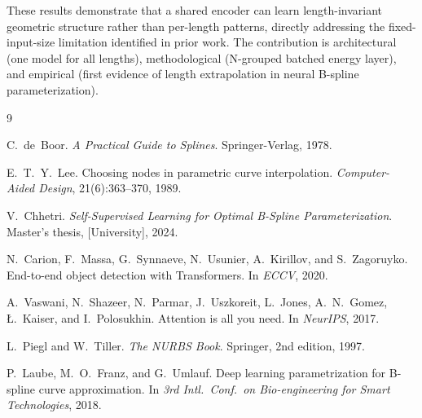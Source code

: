 \documentclass[11pt, a4paper]{article}
\begin{document}
These results demonstrate that a shared encoder can learn
length-invariant geometric structure rather than per-length patterns,
directly addressing the fixed-input-size limitation identified in
prior work. The contribution is architectural (one model for all
lengths), methodological (N-grouped batched energy layer), and
empirical (first evidence of length extrapolation in neural B-spline
parameterization).


\begin{thebibliography}{9}

C.~de~Boor.
\newblock \emph{A Practical Guide to Splines}.
\newblock Springer-Verlag, 1978.

E.~T.~Y.~Lee.
\newblock Choosing nodes in parametric curve interpolation.
\newblock \emph{Computer-Aided Design}, 21(6):363--370, 1989.

V.~Chhetri.
\newblock \emph{Self-Supervised Learning for Optimal B-Spline
  Parameterization}.
\newblock Master's thesis, [University], 2024.

N.~Carion, F.~Massa, G.~Synnaeve, N.~Usunier, A.~Kirillov, and
  S.~Zagoruyko.
\newblock End-to-end object detection with Transformers.
\newblock In \emph{ECCV}, 2020.

A.~Vaswani, N.~Shazeer, N.~Parmar, J.~Uszkoreit, L.~Jones,
  A.~N.~Gomez, {\L}.~Kaiser, and I.~Polosukhin.
\newblock Attention is all you need.
\newblock In \emph{NeurIPS}, 2017.

L.~Piegl and W.~Tiller.
\newblock \emph{The NURBS Book}.
\newblock Springer, 2nd edition, 1997.

P.~Laube, M.~O.~Franz, and G.~Umlauf.
\newblock Deep learning parametrization for B-spline curve approximation.
\newblock In \emph{3rd Intl.\ Conf.\ on Bio-engineering for Smart Technologies},
  2018.

\end{thebibliography}
\end{document}
